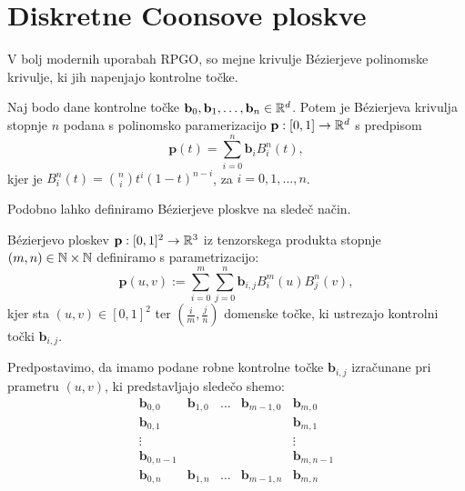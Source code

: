\documentclass[a4paper,12pt]{article}
\begin{document}
\section{Diskretne Coonsove ploskve}
V bolj modernih uporabah RPGO, so mejne krivulje Bézierjeve polinomske krivulje, 
ki jih napenjajo kontrolne točke. 
\begin{definicija}
    Naj bodo dane kontrolne točke $\mathbf{b}_0, \mathbf{b}_1, \dots, \mathbf{b}_n \in \mathbb{R}^d$. 
    Potem je Bézierjeva krivulja stopnje $n$ podana s polinomsko paramerizacijo $\mathbf{p}: [0,1] \rightarrow \mathbb{R}^d$ s predpisom 
    $$\mathbf{p}(t) = \sum_{i=0}^n \mathbf{b}_{i} B_i^n(t),$$
    kjer je $B_i^n(t) = \binom{n}{i} t^i (1-t)^{n-i}$, za $i = 0, 1,\dots,n$. 
\end{definicija}

Podobno lahko definiramo Bézierjeve ploskve na sledeč način.

\begin{definicija}
    Bézierjevo ploskev $\mathbf{p} : [0,1]^2 \rightarrow \mathbb{R}^3$ iz tenzorskega produkta stopnje 
    $(m, n) \in \mathbb{N} \times \mathbb{N}$ definiramo s parametrizacijo:
    $$\mathbf{p}(u,v) := \sum_{i=0}^m \sum_{j=0}^n \mathbf{b}_{i,j} B_i^m(u)B_j^n(v),$$
    kjer sta $(u,v) \in [0,1]^2$ ter $(\frac{i}{m}, \frac{j}{n})$
    domenske točke, ki ustrezajo kontrolni točki $\mathbf{b}_{i,j}$.
\end{definicija}


Predpostavimo, da imamo podane robne kontrolne točke $\mathbf{b}_{i,j}$ 
izračunane pri prametru $(u,v)$, ki predstavljajo sledečo shemo: 
$$
\begin{matrix}
   \mathbf{b}_{0,0}  &\mathbf{b}_{1,0} & \ldots &\mathbf{b}_{m-1,0} &\mathbf{b}_{m,0} \\
   \mathbf{b}_{0,1}  &                 &        &                   &\mathbf{b}_{m,1} \\
   \vdots            &                 &        &                   &  \vdots\\
   \mathbf{b}_{0,n-1} &                &        &                    &\mathbf{b}_{m,n-1} \\ 
   \mathbf{b}_{0,n}  &\mathbf{b}_{1,n} & \ldots &\mathbf{b}_{m-1,n} &\mathbf{b}_{m,n} 
\end{matrix}
$$

   
\end{document}
